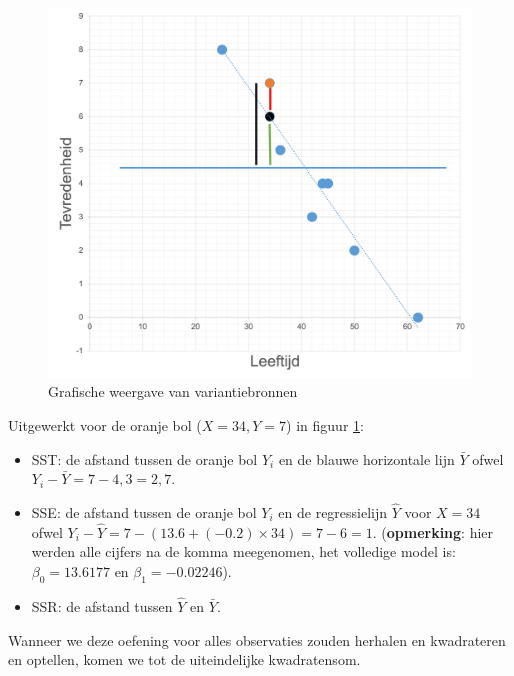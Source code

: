 \documentclass[
]{book}
\providecommand{\tightlist}{%
  \setlength{\itemsep}{0pt}\setlength{\parskip}{0pt}}
\theoremstyle{definition}
\theoremstyle{definition}
\theoremstyle{definition}
\theoremstyle{definition}
\theoremstyle{remark}
\begin{document}
\begin{figure}
\includegraphics[width=1\linewidth]{img/lm_sst} \caption{Grafische weergave van variantiebronnen}\label{fig:lmsst}
\end{figure}

Uitgewerkt voor de oranje bol (\(X = 34, Y = 7\)) in figuur \ref{fig:lmsst}:

\begin{itemize}
\tightlist
\item
  SST: de afstand tussen de oranje bol \(Y_i\) en de blauwe horizontale lijn \(\bar{Y}\) ofwel \({Y}_i - \bar{Y} = 7 - 4,3 = 2,7\).
\item
  SSE: de afstand tussen de oranje bol \(Y_i\) en de regressielijn \(\hat{Y}\) voor \(X = 34\) ofwel \({Y}_i - \hat{Y} = 7 - (13.6 + (-0.2) \times 34) = 7 - 6 = 1\). (\textbf{opmerking}: hier werden alle cijfers na de komma meegenomen, het volledige model is: \(\beta_0 = 13.6177\) en \(\beta_1 = -0.02246\)).
\item
  SSR: de afstand tussen \(\hat{Y}\) en \(\bar{Y}\).
\end{itemize}

Wanneer we deze oefening voor alles observaties zouden herhalen en kwadrateren en optellen, komen we tot de uiteindelijke kwadratensom.
\end{document}
